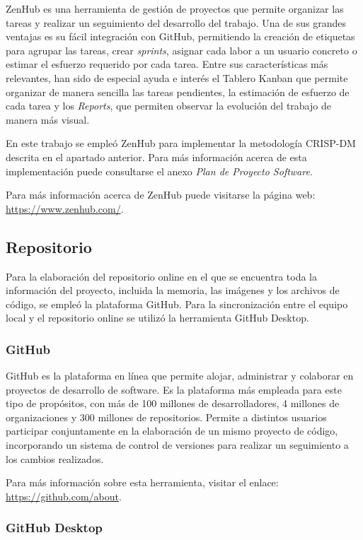 ZenHub es una herramienta de gestión de proyectos que permite organizar las tareas y realizar un seguimiento del desarrollo del trabajo. Una de sus grandes ventajas es su fácil integración con GitHub, permitiendo la creación de etiquetas para agrupar las tareas, crear \textit{sprints}, asignar cada labor a un usuario concreto o estimar el esfuerzo requerido por cada tarea. Entre sus características más relevantes, han sido de especial ayuda e interés el Tablero Kanban que permite organizar de manera sencilla las tareas pendientes, la estimación de esfuerzo de cada tarea y los \textit{Reports}, que permiten observar la evolución del trabajo de manera más visual.

En este trabajo se empleó ZenHub para implementar la metodología CRISP-DM descrita en el apartado anterior. Para más información acerca de esta implementación puede consultarse el anexo \textit{Plan de Proyecto Software}.

Para más información acerca de ZenHub puede visitarse la página web: \url{https://www.zenhub.com/}.

\subsection{Repositorio}

Para la elaboración del repositorio online en el que se encuentra toda la información del proyecto, incluida la memoria, las imágenes y los archivos de código, se empleó la plataforma GitHub. Para la sincronización entre el equipo local y el repositorio online se utilizó la herramienta GitHub Desktop.

\subsubsection{GitHub}

GitHub es la plataforma en línea que permite alojar, administrar y colaborar en proyectos de desarrollo de software. Es la plataforma más empleada para este tipo de propósitos, con más de 100 millones de desarrolladores, 4 millones de organizaciones y 300 millones de repositorios. Permite a distintos usuarios participar conjuntamente en la elaboración de un mismo proyecto de código, incorporando un sistema de control de versiones para realizar un seguimiento a los cambios realizados.

Para más información sobre esta herramienta, visitar el enlace: \url{https://github.com/about}. 

\subsubsection{GitHub Desktop}

